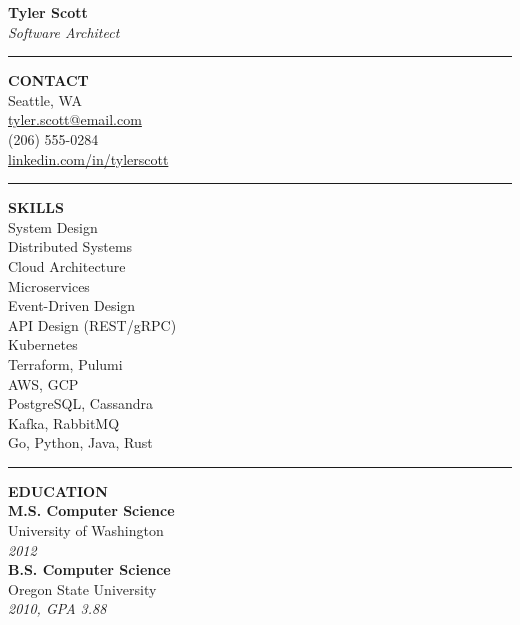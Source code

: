 \documentclass[11pt,a4paper]{article}
\begin{document}
\noindent
\colorbox{sidebar}{%
  \begin{minipage}[t][0.975\textheight]{0.31\textwidth}
  \vspace{8pt}
  \color{sidetext}
  \hspace{6pt}
  \begin{minipage}[t]{0.88\linewidth}

  \begin{center}
    {\large\textbf{\color{white}Tyler Scott}}\\[2pt]
    \textit{\color{accent}Software Architect}
  \end{center}

  \vspace{8pt}
  \noindent\textcolor{accent}{\rule{\linewidth}{0.5pt}}

  \vspace{4pt}
  \noindent\textbf{\small\color{white}CONTACT}\\[2pt]
  \small
  Seattle, WA\\
  \href{mailto:tyler.scott@email.com}{\color{accent}tyler.scott@email.com}\\
  (206) 555-0284\\
  \href{https://linkedin.com/in/tylerscott}{\color{accent}linkedin.com/in/tylerscott}

  \vspace{6pt}
  \noindent\textcolor{accent}{\rule{\linewidth}{0.5pt}}

  \vspace{4pt}
  \noindent\textbf{\small\color{white}SKILLS}\\[2pt]
  \small
  System Design\\
  Distributed Systems\\
  Cloud Architecture\\
  Microservices\\
  Event-Driven Design\\
  API Design (REST/gRPC)\\
  Kubernetes\\
  Terraform, Pulumi\\
  AWS, GCP\\
  PostgreSQL, Cassandra\\
  Kafka, RabbitMQ\\
  Go, Python, Java, Rust

  \vspace{6pt}
  \noindent\textcolor{accent}{\rule{\linewidth}{0.5pt}}

  \vspace{4pt}
  \noindent\textbf{\small\color{white}EDUCATION}\\[2pt]
  \small
  \textbf{\color{white}M.S. Computer Science}\\
  University of Washington\\
  \textit{2012}\\[4pt]
  \textbf{\color{white}B.S. Computer Science}\\
  Oregon State University\\
  \textit{2010, GPA 3.88}


\end{minipage}
\end{minipage}}
\end{document}
